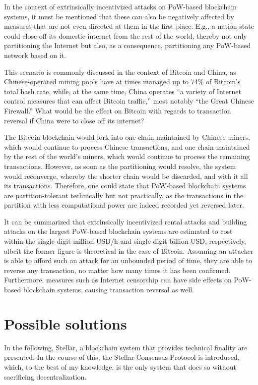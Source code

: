 In the context of extrinsically incentivized attacks on PoW-based blockchain systems, it must be mentioned that these  can also be negatively affected by measures that are not even directed at them in the first place.
E.g., a nation state could close off its domestic internet from the rest of the world, thereby not only partitioning the Internet but also, as a consequence, partitioning any PoW-based network based on it.

This scenario is commonly discussed in the context of Bitcoin and China, as Chinese-operated mining pools have at times managed up to 74\% of Bitcoin's total hash rate, while, at the same time, China operates ``a variety of Internet control measures that can affect Bitcoin traffic,'' most notably ``the Great Chinese Firewall.'' \autocite[5]{kaiser2018}
What would be the effect on Bitcoin with regards to transaction reversal if China were to close off its internet?

The Bitcoin blockchain would fork into one chain maintained by Chinese miners, which would continue to process Chinese transactions, and one chain maintained by the rest of the world's miners, which would continue to process the remaining transactions.
However, as soon as the partitioning would resolve, the system would reconverge, whereby the shorter chain would be discarded, and with it all its transactions.
Therefore, one could state that PoW-based blockchain systems are partition-tolerant technically but not practically, as the transactions in the partition with less computational power are indeed recorded yet reversed later.

It can be summarized that extrinsically incentivized rental attacks and building attacks on the largest PoW-based blockchain systems are estimated to cost within the single-digit million USD/h and single-digit billion USD, respectively, albeit the former figure is theoretical in the case of Bitcoin.
Assuming an attacker is able to afford such an attack for an unbounded period of time, they are able to reverse any transaction, no matter how many times it has been confirmed.
Furthermore, measures such as Internet censorship can have side effects on PoW-based blockchain systems, causing transaction reversal as well.

\section{Possible solutions}

In the following, Stellar, a blockchain system that provides technical finality are presented.
In the course of this, the Stellar Consensus Protocol is introduced, which, to the best of my knowledge, is the only system that does so without sacrificing decentralization.

